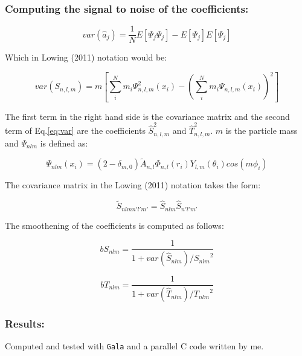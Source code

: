 \documentclass[14pt]{article}
\begin{document}
\subsubsection{Computing the signal to noise of the coefficients:}


\begin{equation}
  var(\hat{a}_j) = \dfrac{1}{N}{E[\Psi_j\Psi_j] - E[\Psi_j]E[\Psi_j]}
\end{equation}

Which in Lowing (2011) notation would be:

\begin{equation}\label{eq:var}
  var(S_{n,l,m}) = m \left[ \sum_{i}^{N}m_i \Psi_{n,l,m}^2(x_i)
   - \left(\sum_{i}^{N}m_i \Psi_{n,l,m}(x_i)\right)^2
   \right]
\end{equation}

The first term in the right hand side is the covariance matrix and
the second term of Eq.\ref{eq:var} are the coefficients
$\hat{S}_{n,l,m}^2$ and $\hat{T}_{n,l,m}^2$. $m$ is the particle
mass and $\Psi_{nlm}$ is defined as:

\begin{equation}
  \Psi_{nlm}(x_i) = (2-\delta_{m,0})
  \tilde{A}_{n,l}\Phi_{n,l}(r_i)Y_{l,m}(\theta_i)cos(m\phi_i)
\end{equation}

The covariance matrix in the Lowing (2011) notation takes the form:

\begin{equation}
  \tilde{S}_{nlm n'l'm'} = \hat{S}_{nlm} \hat{S}_{n'l'm'}
\end{equation}

The smoothening of the coefficients is computed as follows:

\begin{equation}
  bS_{nlm} = \dfrac{1}{1 + var(\hat{S}_{nlm})/{S_{nlm}}^2}
\end{equation}

\begin{equation}
  bT_{nlm} = \dfrac{1}{1 + var(\hat{T}_{nlm})/{T_{nlm}}^2}
\end{equation}



\subsubsection{Results:}

Computed and tested with \verb+Gala+ and a parallel  C code written by me. 
\end{document}

